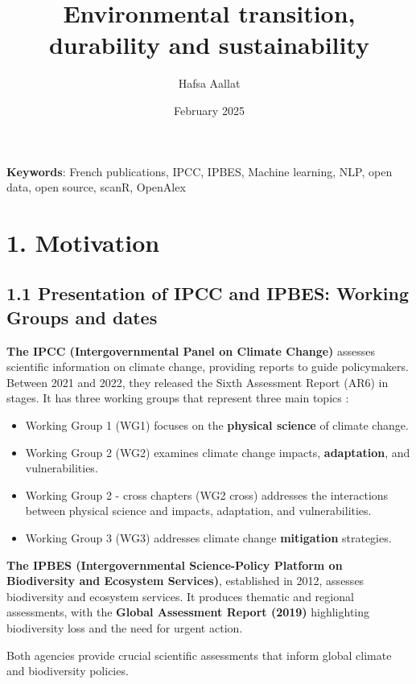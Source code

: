 \documentclass[
]{article}
\title{Environmental transition, durability and sustainability}
\author[%
  1%
  ]{%
  Hafsa Aallat%
}
\affil[1]{French Ministry of Higher Education and Research, Paris,
France}
\date{February 2025}
\providecommand{\tightlist}{%
  \setlength{\itemsep}{0pt}\setlength{\parskip}{0pt}}
\begin{document}
\maketitle

\textbf{Keywords}: French publications, IPCC, IPBES, Machine learning,
NLP, open data, open source, scanR, OpenAlex

\hypertarget{motivation}{%
\section{1. Motivation}\label{motivation}}

\hypertarget{presentation-of-ipcc-and-ipbes-working-groups-and-dates}{%
\subsection{1.1 Presentation of IPCC and IPBES: Working Groups and
dates}\label{presentation-of-ipcc-and-ipbes-working-groups-and-dates}}

\textbf{The IPCC (Intergovernmental Panel on Climate Change)} assesses
scientific information on climate change, providing reports to guide
policymakers. Between 2021 and 2022, they released the Sixth Assessment
Report (AR6) in stages. It has three working groups that represent three
main topics :

\begin{itemize}
\tightlist
\item
  Working Group 1 (WG1) focuses on the \textbf{physical science} of
  climate change.
\item
  Working Group 2 (WG2) examines climate change impacts,
  \textbf{adaptation}, and vulnerabilities.
\item
  Working Group 2 - cross chapters (WG2 cross) addresses the
  interactions between physical science and impacts, adaptation, and
  vulnerabilities.
\item
  Working Group 3 (WG3) addresses climate change \textbf{mitigation}
  strategies.
\end{itemize}

\textbf{The IPBES (Intergovernmental Science-Policy Platform on
Biodiversity and Ecosystem Services)}, established in 2012, assesses
biodiversity and ecosystem services. It produces thematic and regional
assessments, with the \textbf{Global Assessment Report (2019)}
highlighting biodiversity loss and the need for urgent action.

Both agencies provide crucial scientific assessments that inform global
climate and biodiversity policies.
\end{document}
